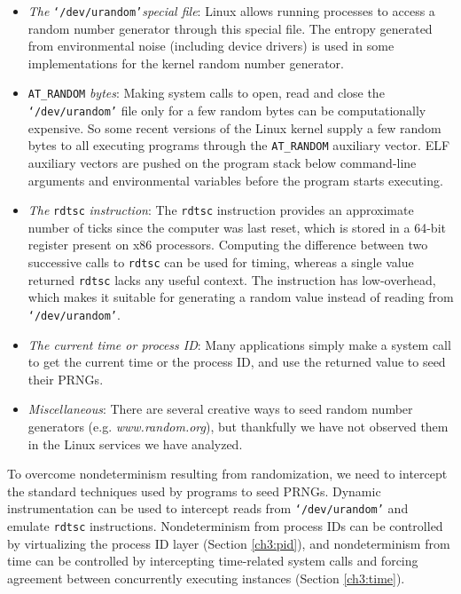 \begin{itemize}

\item {\em The} \texttt{`/dev/urandom'}{\em special file}: Linux allows
running processes to access a random number generator through this special file. The entropy generated
from environmental noise (including device drivers)
is used in some implementations for the kernel random number generator.
\item \texttt{AT\_RANDOM} {\em bytes}: 
Making system calls to open, read and close the
\texttt{`/dev/urandom'} file only for a
few random bytes can be computationally expensive. So 
some recent versions of the Linux kernel supply
a few random bytes to all executing programs
through the \texttt{AT\_RANDOM} auxiliary vector.
ELF auxiliary vectors are pushed on the program
stack below command-line arguments and environmental
variables before the program starts executing.

\item {\em The} \texttt{rdtsc} {\em instruction}:
The \texttt{rdtsc} instruction provides an approximate number of ticks since
the computer was last reset, which is stored in a 64-bit register present
on x86 processors. Computing the difference between two successive
calls to \texttt{rdtsc} can be used for timing, whereas a single
value returned \texttt{rdtsc} lacks any useful context.  
The instruction has low-overhead, which makes it suitable for generating a random value
instead of reading from \texttt{`/dev/urandom'}. 

\item {\em The current time or process ID}: Many applications simply make a system call
to get the current time or the process ID, and use the returned value to seed their PRNGs. 

\item {\em Miscellaneous}: There
are several creative ways to seed random number
generators (e.g. {\em www.random.org}),
but thankfully we have not observed them
in the Linux services we have analyzed.
      
\end{itemize}

To overcome nondeterminism resulting from randomization, 
we need to intercept the standard techniques
used by programs to seed PRNGs.
Dynamic instrumentation can be used to 
intercept reads from \texttt{`/dev/urandom'}
and emulate \texttt{rdtsc} instructions.
Nondeterminism from process IDs
can be controlled by virtualizing the process ID
layer (Section \ref{ch3:pid}), and nondeterminism
from time can be controlled by intercepting
time-related system calls and forcing
agreement between concurrently executing 
instances (Section \ref{ch3:time}).

